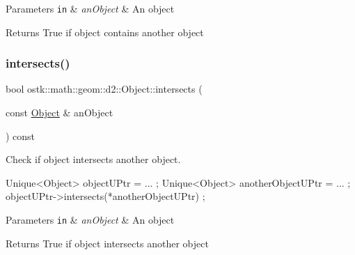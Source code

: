 \begin{DoxyParams}[1]{Parameters}
\mbox{\tt in}  & {\em an\+Object} & An object \\
\hline
\end{DoxyParams}
\begin{DoxyReturn}{Returns}
True if object contains another object 
\end{DoxyReturn}
\mbox{\label{classostk_1_1math_1_1geom_1_1d2_1_1_object_a8791f58dd95e68a1eb4271aa15f7cd12}} 
\subsubsection{\texorpdfstring{intersects()}{intersects()}}
{\footnotesize\ttfamily bool ostk\+::math\+::geom\+::d2\+::\+Object\+::intersects (\begin{DoxyParamCaption}\item[{const \hyperlink{classostk_1_1math_1_1geom_1_1d2_1_1_object}{Object} \&}]{an\+Object }\end{DoxyParamCaption}) const\hspace{0.3cm}{\ttfamily [virtual]}}



Check if object intersects another object. 


\begin{DoxyCode}
Unique<Object> objectUPtr = ... ;
Unique<Object> anotherObjectUPtr = ... ;
objectUPtr->intersects(*anotherObjectUPtr) ;
\end{DoxyCode}



\begin{DoxyParams}[1]{Parameters}
\mbox{\tt in}  & {\em an\+Object} & An object \\
\hline
\end{DoxyParams}
\begin{DoxyReturn}{Returns}
True if object intersects another object 
\end{DoxyReturn}
\mbox{\label{classostk_1_1math_1_1geom_1_1d2_1_1_object_a456cc7121218d24c1322d0fe54230cc4}} 
